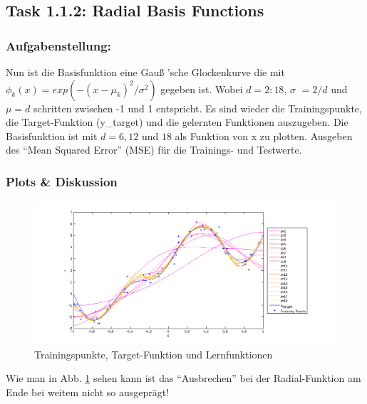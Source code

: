 \subsection{Task 1.1.2: Radial Basis Functions}


\subsubsection{Aufgabenstellung:}
Nun ist die Basisfunktion eine Gau\ss{} 'sche Glockenkurve die mit $\phi_k(x) = exp(-(x-\mu_k)^2 /\sigma^2 )$ gegeben ist.
Wobei $d=2:18$, $\sigma$ $= 2/d$ und $\mu =d$ schritten zwischen -1 und 1 entspricht.
Es sind wieder  die Trainingspunkte, die Target-Funktion (y\_target) und die gelernten Funktionen auszugeben.
Die Basisfunktion ist mit $d=6,12$ und $18$ als Funktion von x zu plotten.
Ausgeben des ``Mean Squared Error'' (MSE) für die Trainings- und Testwerte.



\subsubsection{Plots \& Diskussion}


\begin{figure}[h!]
\begin{center}
 \includegraphics[width=1\textwidth]{./figures/RBF_learn}
 \caption[Trainingspunkte, Target-Funktion und Lernfunktionen]{Trainingspunkte, Target-Funktion und Lernfunktionen}
\label{fig:RBF_learn}
\end{center}
\end{figure}



Wie man in Abb. \ref{fig:RBF_learn} sehen kann ist das ``Ausbrechen'' bei der Radial-Funktion am Ende bei weitem nicht so ausgeprägt!

